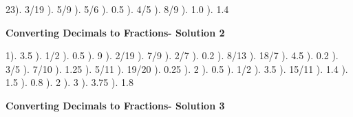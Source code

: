 \documentclass{article}%
\begin{document}
23). 3/19%
). 5/9%
). 5/6%
). 0.5%
). 4/5%
). 8/9%
). 1.0%
). 1.4%
\newline%
\newpage%
\large%
\begin{center}%
\textbf{Converting Decimals to Fractions- Solution 2}%
\newline%
\end{center} \normalsize%
1). 3.5%
). 1/2%
). 0.5%
). 9%
). 2/19%
). 7/9%
). 2/7%
). 0.2%
). 8/13%
). 18/7%
). 4.5%
). 0.2%
). 3/5%
). 7/10%
). 1.25%
). 5/11%
). 19/20%
). 0.25%
). 2%
). 0.5%
). 1/2%
). 3.5%
). 15/11%
). 1.4%
). 1.5%
). 0.8%
). 2%
). 3%
). 3.75%
). 1.8%
\newline%
\newpage%
\large%
\begin{center}%
\textbf{Converting Decimals to Fractions- Solution 3}%
\newline%
\end{center} \normalsize%
\end{document}
